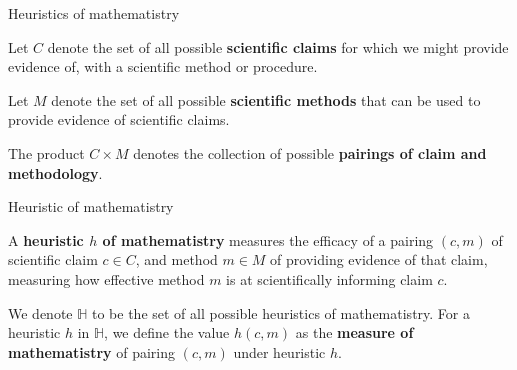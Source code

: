 \documentclass{beamer}
\begin{document}
\begin{frame}{Heuristics of mathematistry}

Let \(C\) denote the set of all possible \textbf{scientific claims} for which we might provide evidence of, with a scientific method or procedure.

\bigskip

Let \(M\) denote the set of all possible \textbf{scientific methods} that can be used to provide evidence of scientific claims.

\bigskip

The product \(C \times M\) denotes the collection of possible \textbf{pairings of claim and methodology}.

\end{frame}

\begin{frame}{Heuristic of mathematistry}

\begin{definition} A \textbf{heuristic \(h\) of mathematistry} measures the efficacy of a pairing \((c,m)\) of scientific claim \(c \in C\), and method  \(m \in M\) of providing evidence of that claim, measuring how effective method \(m\) is at scientifically informing claim \(c\).

\vspace{1cm}

We denote $\mathbb H$ to be the set of all possible heuristics of mathematistry. For a heuristic $h$ in $\mathbb H$, we define the value $h(c,m)$ as the \textbf{measure of mathematistry} of pairing $(c,m)$ under heuristic $h$.
\end{definition}

\end{frame}
\end{document}
